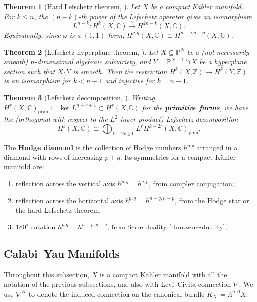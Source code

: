 \documentclass{report}
\theoremstyle{plain}
\newtheorem{theorem}{Theorem}[section]
\theoremstyle{definition}
\theoremstyle{remark}
\newcommand{\bC}{\mathbb{C}}
\newcommand{\bP}{\mathbb{P}}
\newcommand{\bZ}{\mathbb{Z}}
\begin{document}
\begin{theorem}[Hard Lefschetz theorem, {\cite[Theorem 6.25]{Voisin2002}}]
  Let $X$ be a compact K\"ahler manifold. For $k \le n$, the
  $(n-k)$-th power of the Lefschetz operator gives an isomorphism
  \[ L^{n-k}\colon H^k(X, \bC) \xrightarrow{\sim} H^{2n-k}(X, \bC). \]
  Equivalently, since $\omega$ is a $(1,1)$-form, $H^{p,q}(X, \bC)
  \cong H^{n-q,n-p}(X, \bC)$.
\end{theorem}

\begin{theorem}[Lefschetz hyperplane theorem, {\cite[Theorem 1.23]{Voisin2003}}] \label{thm:lefschetz-hyperplane}
  Let $X \subseteq \bP^N$ be a (not necessarily smooth)
  $n$-dimensional algebraic subvariety, and $Y = \bP^{N-1} \cap X$ be
  a hyperplane section such that $X \setminus Y$ is smooth. Then the
  restriction $H^k(X, \bZ) \to H^k(Y, \bZ)$ is an isomorphism for $k <
  n-1$ and injective for $k = n-1$.
\end{theorem}

\begin{theorem}[Lefschetz decomposition, {\cite[Corollary 6.26, Lemma 6.31]{Voisin2002}}]
  Writing $H^r(X, \bC)_{\text{prim}} \coloneqq \ker L^{n-r+1} \subset
  H^r(X, \bC)$ for the {\bf primitive forms}, we have the (orthogonal
  with respect to the $L^2$ inner product) Lefschetz decomposition
  \[ H^k(X, \bC) \cong \bigoplus_{k-2r \ge 0} L^r H^{k-2r}(X, \bC)_{\text{prim}}. \]
\end{theorem}

The {\bf Hodge diamond} is the collection of Hodge numbers $h^{p,q}$
arranged in a diamond with rows of increasing $p+q$. Its symmetries
for a compact K\"ahler manifold are:
\begin{enumerate}
\item reflection across the vertical axis $h^{p,q} = h^{q,p}$, from
  complex conjugation;
\item reflection across the horizontal axis $h^{p,q} = h^{n-q,n-p}$,
  from the Hodge star or the hard Lefschetz theorem;
\item $180^{\circ}$ rotation $h^{p,q} = h^{n-p,n-q}$, from Serre
  duality \ref{thm:serre-duality};
\end{enumerate}

\subsection{Calabi--Yau Manifolds}

Throughout this subsection, $X$ is a compact K\"ahler manifold with
all the notation of the previous subsections, and also with
Levi--Civita connection $\nabla$. We use $\nabla^K$ to denote the
induced connection on the canonical bundle $K_X \coloneqq
\Lambda^{n,0}X$.
\end{document}
